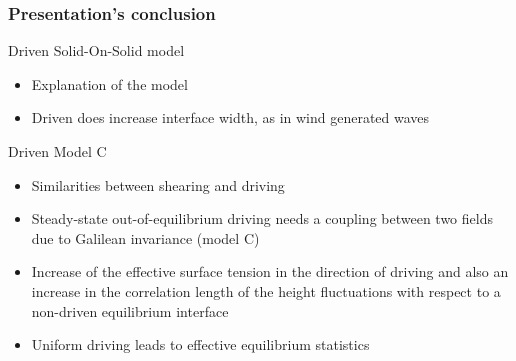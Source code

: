 \documentclass[9pt, dvipsnames]{beamer} %
\begin{document}
\begin{frame}
    \frametitle{Presentation's conclusion}
    \begin{block}{Driven Solid-On-Solid model}
    \begin{itemize}
    	\item Explanation of the model 
        \item Driven does increase interface width, as in wind generated waves
    \end{itemize}
    \end{block}    
    \begin{block}{Driven Model C}
    \begin{itemize}
    	\item Similarities between shearing and driving
    	\item Steady-state out-of-equilibrium driving needs a coupling between two fields due to Galilean invariance (model C)
        \item Increase of the effective surface tension in the direction of driving and also an increase in the correlation length of the height fluctuations with respect to a non-driven equilibrium interface
        \item Uniform driving leads to effective equilibrium statistics
    \end{itemize}
    \end{block}
\end{frame} 
\end{document}
